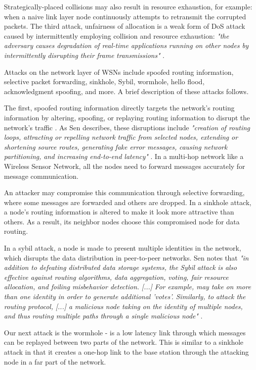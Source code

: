 \documentclass[12pt,a4paper,twoside]{report}
\begin{document}
Strategically-placed collisions may also result in resource exhaustion, for example: when a naive link layer node continuously attempts to retransmit the corrupted packets. The third attack, unfairness of allocation is a weak form of DoS attack caused by intermittently employing collision and resource exhaustion: \emph{"the adversary causes degradation of real-time applications running on other nodes by intermittently disrupting their frame transmissions"} \cite{sen:2009}. \par\par
Attacks on the network layer of WSNs include spoofed routing information, selective packet forwarding, sinkhole, Sybil, wormhole, hello flood, acknowledgment spoofing, and more. A brief description of these attacks follows. \par
The first, spoofed routing information directly targets the network's routing information by altering, spoofing, or replaying routing information to disrupt the network's traffic \cite{sen:2009}. As Sen describes, these disruptions include \emph{"creation of routing loops, attracting or repelling network traffic from selected nodes, extending or shortening source routes, generating fake error messages, causing network partitioning, and increasing end-to-end latency"} \cite{sen:2009}. In a multi-hop network like a Wireless Sensor Network, all the nodes need to forward messages accurately for message communication. \par
An attacker may compromise this communication through selective forwarding, where some messages are forwarded and others are dropped. In a sinkhole attack, a node's routing information is altered to make it look more attractive than others. As a result, its neighbor nodes choose this compromised node for data routing. \par
In a sybil attack, a node is made to present multiple identities in the network, which disrupts the data distribution in peer-to-peer networks. Sen notes that \emph{"in addition to defeating distributed data storage systems, the Sybil attack is also effective against routing algorithms, data aggregation, voting, fair resource allocation, and foiling misbehavior detection. [...] For example, may take on more than one identity in order to generate additional 'votes'. Similarly, to attack the routing protocol, [...] a malicious node taking on the identity of multiple nodes, and thus routing multiple paths through a single malicious node"} \cite{sen:2009}. \par
Our next attack is the wormhole - is a low latency link through which messages can be replayed between two parts of the network. This is similar to a sinkhole attack in that it creates a one-hop link to the base station through the attacking node in a far part of the network. \par
\end{document}

